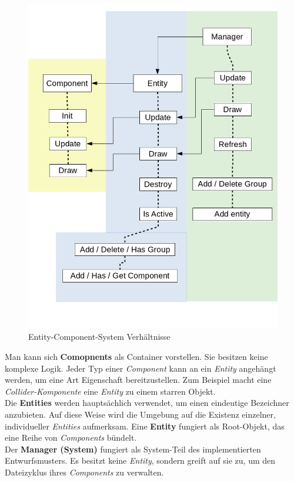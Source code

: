 \documentclass[
  10pt,
  a4paper,
  oneside,
  headers,
  headinclude,
  footinclude,
  BCOR5mm,
]{article}
\begin{document}
\begin{figure}[h]
  \centering
  \includegraphics[scale=0.3]{Scheme}
  \caption{Entity-Component-System Verhältnisse}
  \label{fig:ECS}
\end{figure}

Man kann sich \textbf{Comopnents} als Container vorstellen. Sie besitzen keine
komplexe Logik. Jeder Typ einer \textit{Component} kann an ein \textit{Entity}
angehängt werden, um eine Art Eigenschaft bereitzustellen. Zum Beispiel macht
eine \textit{Collider-Komponente} eine \textit{Entity} zu einem starren Objekt. \\
Die \textbf{Entities} werden hauptsächlich verwendet, um einen eindeutige
Bezeichner anzubieten. Auf diese Weise wird die Umgebung auf die Existenz
einzelner, individueller \textit{Entities} aufmerksam. Eine \textbf{Entity}
fungiert als Root-Objekt, das eine Reihe von \textit{Components} bündelt. \\
Der \textbf{Manager (System)} fungiert als System-Teil des implementierten
Entwurfsmusters. Es besitzt keine \textit{Entity}, sondern greift auf sie zu, um
den Dateizyklus ihres \textit{Components} zu verwalten.
\end{document}
